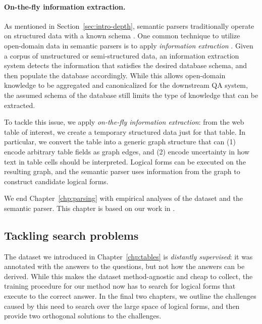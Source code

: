 \paragraph{On-the-fly information extraction.}
As mentioned in Section~\ref{sec:intro-depth},
semantic parsers traditionally operate on structured data
with a known schema
\cite{zelle96geoquery,zettlemoyer07relaxed,liang11dcs}.
One common technique to utilize open-domain data
in semantic parsers is to apply \emph{information extraction}
\cite{hearst1992automatic,kushmerick1997wrapper,banko2007open,mintz2009distant}.
Given a corpus of unstructured or semi-structured data,
an information extraction system detects the information
that satisfies the desired database schema,
and then populate the database accordingly.
While this allows open-domain knowledge to be aggregated
and canonicalized for the downstream QA system,
the assumed schema of the database
still limits the type of knowledge that can be extracted.

To tackle this issue, we apply \emph{on-the-fly information extraction}:
from the web table of interest,
we create a temporary structured data just for that table.
In particular,
we convert the table into a generic graph structure that can
(1) encode arbitrary table fields as graph edges, and
(2) encode uncertainty in how text in table cells should be interpreted.
Logical forms can be executed on the resulting graph,
and the semantic parser uses information from the graph
to construct candidate logical forms.

We end Chapter~\ref{chp:parsing} with empirical analyses
of the dataset and the semantic parser.
This chapter is based on our work in
\citet{pasupat2015compositional}.

\subsection{Tackling search problems}

The \wtq dataset we introduced in Chapter~\ref{chp:tables}
is \emph{distantly supervised}:
it was annotated with the answers to the questions,
but not how the answers can be derived.
While this makes the dataset method-agnostic
and cheap to collect,
the training procedure for our method
now has to search for logical forms
that execute to the correct answer.
In the final two chapters,
we outline the challenges caused by this need to search
over the large space of logical forms,
and then provide two orthogonal solutions to the challenges.

